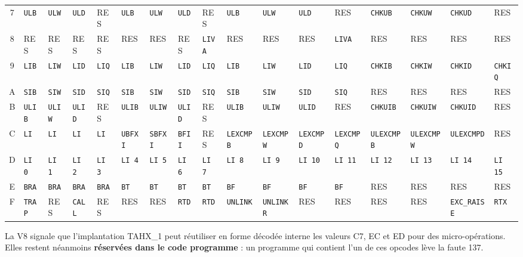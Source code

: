 \documentclass[10pt,a4paper,twoside,openany]{book}
\newcommand{\res}{\textcolor{TahxGray}{RES}}
\begin{document}
\begin{landscape}
\begin{tabular}{c|*{16}{>{\centering\arraybackslash}p{1.37cm}}}
7 & \texttt{ULB} & \texttt{ULW} & \texttt{ULD} & \res & \texttt{ULB} & \texttt{ULW} & \texttt{ULD} & \res & \texttt{ULB} & \texttt{ULW} & \texttt{ULD} & \res & \texttt{CHKUB} & \texttt{CHKUW} & \texttt{CHKUD} & \res\\
8 & \res & \res & \res & \res & \res & \res & \res & \texttt{LIVA} & \res & \res & \res & \texttt{LIVA} & \res & \res & \res & \res\\
9 & \texttt{LIB} & \texttt{LIW} & \texttt{LID} & \texttt{LIQ} & \texttt{LIB} & \texttt{LIW} & \texttt{LID} & \texttt{LIQ} & \texttt{LIB} & \texttt{LIW} & \texttt{LID} & \texttt{LIQ} & \texttt{CHKIB} & \texttt{CHKIW} & \texttt{CHKID} & \texttt{CHKIQ}\\
A & \texttt{SIB} & \texttt{SIW} & \texttt{SID} & \texttt{SIQ} & \texttt{SIB} & \texttt{SIW} & \texttt{SID} & \texttt{SIQ} & \texttt{SIB} & \texttt{SIW} & \texttt{SID} & \texttt{SIQ} & \res & \res & \res & \res\\
B & \texttt{ULIB} & \texttt{ULIW} & \texttt{ULID} & \res & \texttt{ULIB} & \texttt{ULIW} & \texttt{ULID} & \res & \texttt{ULIB} & \texttt{ULIW} & \texttt{ULID} & \res & \texttt{CHKUIB} & \texttt{CHKUIW} & \texttt{CHKUID} & \res\\
C & \texttt{LI} & \texttt{LI} & \texttt{LI} & \texttt{LI} & \texttt{UBFXI} & \texttt{SBFXI} & \texttt{BFII} & \res & \texttt{LEXCMPB} & \texttt{LEXCMPW} & \texttt{LEXCMPD} & \texttt{LEXCMPQ} & \texttt{ULEXCMPB} & \texttt{ULEXCMPW} & \texttt{ULEXCMPD} & \res\\
D & \texttt{LI 0} & \texttt{LI 1} & \texttt{LI 2} & \texttt{LI 3} & \texttt{LI 4} & \texttt{LI 5} & \texttt{LI 6} & \texttt{LI 7} & \texttt{LI 8} & \texttt{LI 9} & \texttt{LI 10} & \texttt{LI 11} & \texttt{LI 12} & \texttt{LI 13} & \texttt{LI 14} & \texttt{LI 15}\\
E & \texttt{BRA} & \texttt{BRA} & \texttt{BRA} & \texttt{BRA} & \texttt{BT} & \texttt{BT} & \texttt{BT} & \texttt{BT} & \texttt{BF} & \texttt{BF} & \texttt{BF} & \texttt{BF} & \res & \res & \res & \res\\
F & \texttt{TRAP} & \res & \texttt{CALL} & \res & \res & \res & \texttt{RTD} & \texttt{RTD} & \texttt{UNLINK} & \texttt{UNLINKR} & \res & \res & \res & \res & \texttt{EXC\_RAISE} & \texttt{RTX}\\
\bottomrule
\end{tabular}
\end{landscape}

\begin{designbox}
La V8 signale que l'implantation TAHX\_1 peut réutiliser en forme décodée interne les valeurs C7, EC et ED pour des micro-opérations. Elles restent néanmoins \textbf{réservées dans le code programme} : un programme qui contient l'un de ces opcodes lève la faute 137.
\end{designbox}
\end{document}
